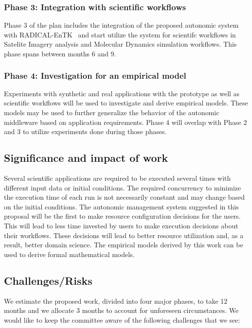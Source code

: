 \subsubsection{Phase 3: Integration with scientific workflows}
Phase 3 of the plan includes the integration of the proposed autonomic system with 
RADICAL-EnTK~\cite{balasubramanian2018harnessing} and start utilize the system for 
scientifc workflows in Satelite Imagery analysis and Molecular Dynamics simulation 
workflows. This phase spans between months 6 and 9.

\subsubsection{Phase 4: Investigation for an empirical model}

Experiments with synthetic and real applications with the prototype as well as 
scientific workflows will be used to investigate and derive empirical models. 
These models may be used to further generalize the behavior of the autonomic 
middleware based on application requirements. Phase 4 will overlap with Phase 2 
and 3 to utilize experiments done during those phases.

\subsection{Significance and impact of work}
Several scientific applications are required to be executed several times with 
different input data or initial conditions. The required concurrency to minimize 
the execution time of each run is not necessarily constant and may change based 
on the initial conditions. The autonomic management system suggested in this 
proposal will be the first to make resource configuration decisions for the users. 
This will lead to less time invested by users to make execution decisions about 
their workflows. These decisions will lead to better resource utilization and, 
as a result, better domain science. The empirical models derived by this work can 
be used to derive formal mathematical models.

\subsection{Challenges/Risks}

We estimate the proposed work, divided into four major phases, to take 12 months 
and we allocate 3 months to account for unforeseen circumstances. We would like 
to keep the committee aware of the following challenges that we see:

